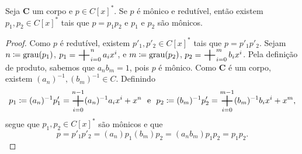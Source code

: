 \begin{prop}
	Seja $\bm C$ um corpo e $p \in C[x]^*$. Se $p$ é mônico e redutível, então existem $p_1,p_2 \in C[x]^*$ tais que $p=p_1p_2$ e $p_1$ e $p_2$ são mônicos.
\end{prop}
\begin{proof}
	Como $p$ é redutível, existem $p'_1,p'_2 \in C[x]^*$ tais que $p=p'_1p'_2$. Sejam $n \coloneqq \operatorname{grau}(p_1)$, $p_1 = \bigsum_{i=0}^n a_ix^i$, e $m \coloneqq \operatorname{grau}(p_2)$, $p_2 = \bigsum_{i=0}^m b_ix^i$. Pela definição de produto, sabemos que $a_nb_m=1$, pois $p$ é mônico. Como $\bm C$ é um corpo, existem $(a_n)^{-1},(b_m)^{-1} \in C$. Definindo
	\begin{equation*}
	p_1 \coloneqq (a_n)^{-1}p'_1 = \bigsum_{i=0}^{n-1} (a_n)^{-1}a_ix^i+ x^n \e p_2 \coloneqq (b_m)^{-1}p'_2 = \bigsum_{i=0}^{m-1} (b_m)^{-1}b_ix^i + x^m,
	\end{equation*}
segue que $p_1,p_2 \in C[x]^*$ são mônicos e que
	\begin{equation*}
	 p = p'_1p'_2 = (a_n)p_1(b_m)p_2 = (a_nb_m)p_1p_2 = p_1p_2.
	\end{equation*}
\end{proof}

